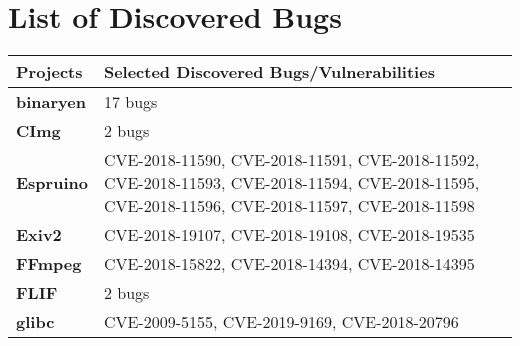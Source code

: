 \chapter{List of Discovered Bugs} \label{app:bugs}

\begin{longtable}{| p{} | p{} |} 

\hline
\textbf{Projects}       & \textbf{Selected Discovered Bugs/Vulnerabilities}                                                                                                                                                  \\ \hline
\textbf{binaryen}       & 17 bugs                                                                                                                                                                                            \\ \hline
\textbf{CImg}           & 2 bugs                                                                                                                                                                                             \\ \hline
\textbf{Espruino}       & CVE-2018-11590, CVE-2018-11591, CVE-2018-11592, CVE-2018-11593, CVE-2018-11594, CVE-2018-11595, CVE-2018-11596, CVE-2018-11597, CVE-2018-11598         \\ \hline
\textbf{Exiv2}          & CVE-2018-19107, CVE-2018-19108, CVE-2018-19535                                                                                                                                                     \\ \hline
\textbf{FFmpeg}         & CVE-2018-15822, CVE-2018-14394, CVE-2018-14395                                                                                                                                                     \\ \hline
\textbf{FLIF}           & 2 bugs                                                                                                                                                                                             \\ \hline
\textbf{glibc}          & CVE-2009-5155, CVE-2019-9169, CVE-2018-20796                                                                                                                                                       \\ \hline

\end{longtable}
